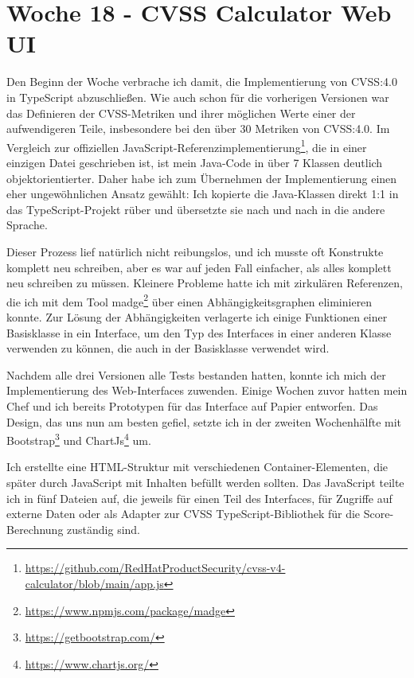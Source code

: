 \section{Woche 18 - CVSS Calculator Web UI} \label{sec:bericht-wo-18-initial}


\lweekdaymarginpar{\weekdayMondayShort, \weekdayTuesdayShort}

Den Beginn der Woche verbrache ich damit, die Implementierung von CVSS:4.0 in TypeScript abzuschließen.
Wie auch schon für die vorherigen Versionen war das Definieren der CVSS-Metriken und ihrer möglichen Werte einer der aufwendigeren Teile, insbesondere bei den über 30 Metriken von CVSS:4.0.
Im Vergleich zur offiziellen JavaScript-Referenzimplementierung\footnote{\url{https://github.com/RedHatProductSecurity/cvss-v4-calculator/blob/main/app.js}}, die in einer einzigen Datei geschrieben ist, ist mein Java-Code in über 7 Klassen deutlich objektorientierter.
Daher habe ich zum Übernehmen der Implementierung einen eher ungewöhnlichen Ansatz gewählt:
Ich kopierte die Java-Klassen direkt 1:1 in das TypeScript-Projekt rüber und übersetzte sie nach und nach in die andere Sprache.

Dieser Prozess lief natürlich nicht reibungslos, und ich musste oft Konstrukte komplett neu schreiben, aber es war auf jeden Fall einfacher, als alles komplett neu schreiben zu müssen.
Kleinere Probleme hatte ich mit zirkulären Referenzen, die ich mit dem Tool madge\footnote{\url{https://www.npmjs.com/package/madge}} über einen Abhängigkeitsgraphen eliminieren konnte.
Zur Lösung der Abhängigkeiten verlagerte ich einige Funktionen einer Basisklasse in ein Interface, um den Typ des Interfaces in einer anderen Klasse verwenden zu können, die auch in der Basisklasse verwendet wird.

\sweekdaymarginpar{\weekdayWednesdayShort\ - \weekdayFridayShort}

Nachdem alle drei Versionen alle Tests bestanden hatten, konnte ich mich der Implementierung des Web-Interfaces zuwenden.
Einige Wochen zuvor hatten mein Chef und ich bereits Prototypen für das Interface auf Papier entworfen.
Das Design, das uns nun am besten gefiel, setzte ich in der zweiten Wochenhälfte mit Bootstrap\footnote{\url{https://getbootstrap.com/}} und ChartJs\footnote{\url{https://www.chartjs.org/}} um.

Ich erstellte eine HTML-Struktur mit verschiedenen Container-Elementen, die später durch JavaScript mit Inhalten befüllt werden sollten.
Das JavaScript teilte ich in fünf Dateien auf, die jeweils für einen Teil des Interfaces, für Zugriffe auf externe Daten oder als Adapter zur CVSS TypeScript-Bibliothek für die Score-Berechnung zuständig sind.

